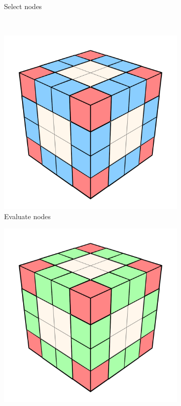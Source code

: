 \begin{figure}[t]
\begin{subfigure}[b]{.3\linewidth}
    \caption{\footnotesize Select nodes}%
    \label{fig:hs-p1f}%
  \end{subfigure}
  \\
  \begin{subfigure}[b]{.3\linewidth}
    \includegraphics[width=\textwidth]{./img/raw/hs-slt-algorithm/hs-slt-algorithm-7.png}%
    \caption{\footnotesize Evaluate nodes}%
    \label{fig:hs-p1g}%
  \end{subfigure}
  \begin{subfigure}[b]{.3\linewidth}
    \includegraphics[width=\textwidth]{./img/raw/hs-slt-algorithm/hs-slt-algorithm-8.png}%

\end{subfigure}
\end{figure}
